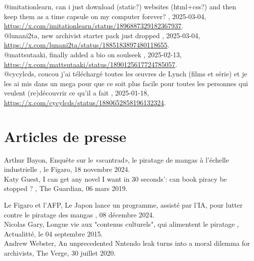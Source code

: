 @imitationlearn, \og can i just download (static?) websites (html+css?) and then keep them as a time capsule on my computer forever? \fg, 2025-03-04, \href{https://x.com/imitationlearn/status/1896887329182367937}{https://x.com/imitationlearn/status/1896887329182367937}. \\

@lunani2ta, \og new archivist starter pack just dropped \fg, 2025-03-04, \href{https://x.com/lunani2ta/status/1885183897480118655}{https://x.com/lunani2ta/status/1885183897480118655}. \\

@mattsutaaki, \og finally added a bio on soulseek \fg, 2025-02-13, \href{https://x.com/mattsutaaki/status/1890125617724785057}{https://x.com/mattsutaaki/status/1890125617724785057}. \\

@cycylcds, \og coucou j’ai téléchargé toutes les œuvres de Lynch (films et série) et je les ai mis dans un mega pour que ce soit plus facile pour toutes les personnes qui veulent (re)découvrir ce qu’il a fait \fg, 2025-01-18, \href{https://x.com/cycylcds/status/1880652858196132324}{https://x.com/cycylcds/status/1880652858196132324}. \\

\section*{Articles de presse}

Arthur Bayon, \og Enquête sur le «scantrad», le piratage de mangas à l'échelle industrielle \fg, le Figaro, 18 novembre 2024.  \\

Katy Guest, \og I can get any novel I want in 30 seconds': can book piracy be stopped ? \fg, The Guardian, 06 mars 2019. 

Le Figaro et l'AFP, \og Le Japon lance un programme, assisté par l’IA, pour lutter contre le piratage des mangas \fg, 08 décembre 2024. \\

Nicolas Gary, \og Longue vie aux "contenus culturels", qui alimentent le piratage \fg, Actualitté, le 04 septembre 2015. \\

Andrew Webster, \og An unprecedented Nntendo leak turns into a moral dilemma for archivists\fg, The Verge, 30 juillet 2020. \\



